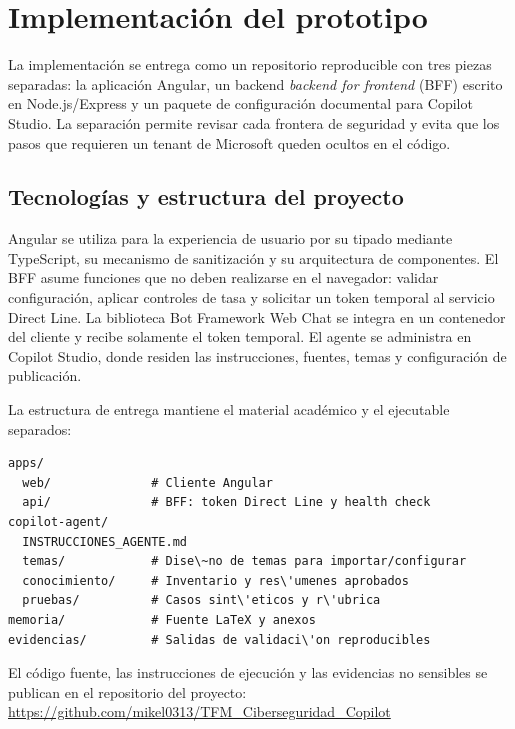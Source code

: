 \chapter{Implementaci\'on del prototipo}
\label{chap:implementacion}

La implementaci\'on se entrega como un repositorio reproducible con tres piezas separadas: la aplicaci\'on Angular, un backend \emph{backend for frontend} (BFF) escrito en Node.js/Express y un paquete de configuraci\'on documental para Copilot Studio. La separaci\'on permite revisar cada frontera de seguridad y evita que los pasos que requieren un tenant de Microsoft queden ocultos en el c\'odigo.

\section{Tecnolog\'ias y estructura del proyecto}

Angular se utiliza para la experiencia de usuario por su tipado mediante TypeScript, su mecanismo de sanitizaci\'on y su arquitectura de componentes. El BFF asume funciones que no deben realizarse en el navegador: validar configuraci\'on, aplicar controles de tasa y solicitar un token temporal al servicio Direct Line. La biblioteca Bot Framework Web Chat se integra en un contenedor del cliente y recibe solamente el token temporal. El agente se administra en Copilot Studio, donde residen las instrucciones, fuentes, temas y configuraci\'on de publicaci\'on.

La estructura de entrega mantiene el material acad\'emico y el ejecutable separados:

\begin{lstlisting}[caption={Estructura l\'ogica del repositorio.},label={lst:estructura}]
apps/
  web/              # Cliente Angular
  api/              # BFF: token Direct Line y health check
copilot-agent/
  INSTRUCCIONES_AGENTE.md
  temas/            # Dise\~no de temas para importar/configurar
  conocimiento/     # Inventario y res\'umenes aprobados
  pruebas/          # Casos sint\'eticos y r\'ubrica
memoria/            # Fuente LaTeX y anexos
evidencias/         # Salidas de validaci\'on reproducibles
\end{lstlisting}

El c\'odigo fuente, las instrucciones de ejecuci\'on y las evidencias no sensibles se publican en el repositorio del proyecto:\newline
\url{https://github.com/mikel0313/TFM_Ciberseguridad_Copilot}

